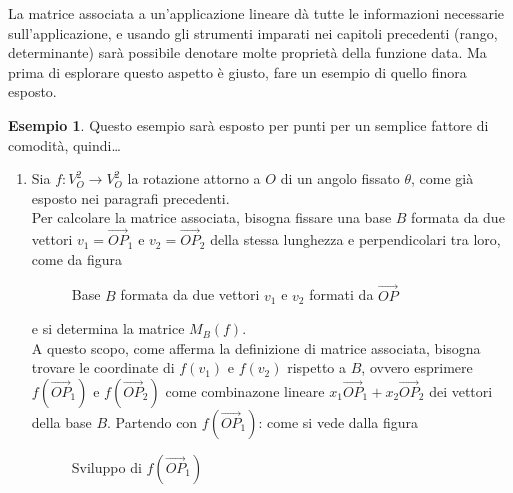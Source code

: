 \documentclass{book}
\theoremstyle{definition}
\newtheorem{es}{Esempio}[section]
\theoremstyle{plain}
\begin{document}
La matrice associata a un'applicazione lineare dà tutte le informazioni
necessarie sull'applicazione, e usando gli strumenti imparati nei capitoli
precedenti (rango, determinante) sarà possibile denotare molte proprietà
della funzione data. Ma prima di esplorare questo aspetto è giusto, fare un
esempio di quello finora esposto.
\clearpage
\begin{es}
  \label{es:mtxAsaplin1}
  Questo esempio sarà esposto per punti per un semplice fattore di
  comodità, quindi\dots
  \begin{enumerate}
  \item Sia $f:V_O^2\to V_O^2$ la rotazione attorno a $O$ di un angolo
    fissato $\theta$, come già esposto nei paragrafi precedenti.\\
    Per calcolare la matrice associata, bisogna fissare una base $B$
    formata da due vettori $v_1=\vec{OP}_1$ e $v_2=\vec{OP}_2$ della
    stessa lunghezza e perpendicolari tra loro, come da figura
    \begin{figure}[ht!]
      \centering
      \resizebox{8cm}{!}{}
      \caption{Base $B$ formata da due vettori $v_1$ e $v_2$ formati da $\vec{OP}$}
      \label{fig:mtxAsaplin1}
    \end{figure}
    e si determina la matrice $M_B(f)$.\\
    A questo scopo, come afferma la definizione di matrice associata, bisogna
    trovare le coordinate di $f(v_1)$ e $f(v_2)$ rispetto a $B$, ovvero esprimere
    $f(\vec{OP}_1)$ e $f(\vec{OP}_2)$ come combinazone lineare $x_1\vec{OP}_1+
    x_2\vec{OP}_2$ dei vettori della base $B$. Partendo con $f(\vec{OP}_1)$: come
    si vede dalla figura
    \begin{figure}[ht!]
      \centering
      \resizebox{8cm}{!}{}
      \caption{Sviluppo di $f(\vec{OP}_1)$}
      \label{fig:mtxAsaplin2}
    \end{figure}


\end{enumerate}
\end{es}
\end{document}
